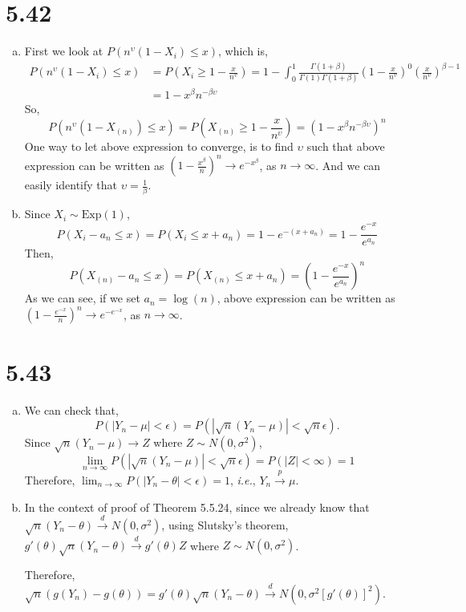 \documentclass[letterpaper]{article}
\newcommand{\Xn}{X_{(n)}}
\begin{document}
\section*{5.42}
\begin{enumerate}[(a)]
\item First we look at $P(n^{\upsilon}(1-X_i) \le x)$, which is,
\begin{align*}
P(n^{\upsilon}(1-X_i) \le x) & = P(X_i \ge 1 - \frac{x}{n^\upsilon}) = 1-\int_0^1 \frac{\Gamma(1+\beta)}{\Gamma(1)\Gamma(1+\beta)} \left(1-\frac{x}{n^\upsilon}\right)^0 \left(\frac{x}{n^\upsilon}\right)^{\beta-1} \\
& = 1 - x^\beta n^{-\beta\upsilon} 
\end{align*}
So, 
\[
P(n^{\upsilon}(1-\Xn) \le x) = P(\Xn \ge 1 - \frac{x}{n^\upsilon}) = (1- x^\beta n^{-\beta\upsilon})^n
\]
One way to let above expression to converge, is to find $\upsilon$ such that above expression can be written as $(1-\frac{x^\beta}{n})^n \to e^{-x^\beta}$, as $n\to\infty$. And we can easily identify that $\upsilon = \frac{1}{\beta}$.
\item Since $X_i \sim \text{Exp}(1)$,
\[
P(X_i - a_n \le x) = P(X_i \le x + a_n) = 1 - e^{-(x+a_n)} = 1 - \frac{e^{-x}}{e^{a_n}}
\]
Then,
\[
P(\Xn - a_n \le x) = P(\Xn \le x + a_n) = \left(1-\frac{e^{-x}}{e^{a_n}}\right)^n
\]
As we can see, if we set $a_n = \log(n)$, above expression can be written as $\left(1-\frac{e^{-x}}{n}\right)^n \to e^{-e^{-x}}$, as $n \to \infty$.
\end{enumerate}
\section*{5.43}
\begin{enumerate}[(a)]
\item We can check that,
\[
P(|Y_n - \mu| < \epsilon) = P(|\sqrt{n}(Y_n - \mu)| < \sqrt{n} \epsilon).
\]
Since $\sqrt{n}(Y_n - \mu) \to Z$ where $Z \sim N(0, \sigma^2)$, 
\[
\lim_{n\to\infty} P(|\sqrt{n}(Y_n - \mu)| < \sqrt{n} \epsilon) = P(|Z| < \infty) = 1
\]
Therefore, $\lim_{n\to\infty} P(|Y_n - \theta| < \epsilon) = 1$, \emph{i.e.}, $Y_n \stackrel{p}{\to} \mu$.
\item In the context of proof of Theorem 5.5.24, since we already know that $\sqrt{n}(Y_n - \theta) \stackrel{d}{\to} N(0, \sigma^2)$, using Slutsky's theorem, $g'(\theta)\sqrt{n}(Y_n - \theta) \stackrel{d}{\to} g'(\theta) Z$ where $Z \sim N(0, \sigma^2)$. 

Therefore, $\sqrt{n}(g(Y_n) - g(\theta)) = g'(\theta)\sqrt{n}(Y_n - \theta) \stackrel{d}{\to} N(0, \sigma^2[g'(\theta)]^2)$.
\end{enumerate}
\end{document}
